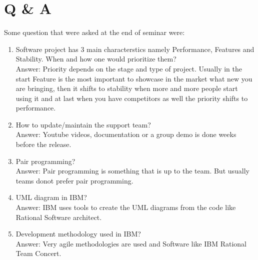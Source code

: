 \section{Q \& A}

Some question that were asked at the end of seminar were:

\begin{enumerate}
    \item Software project has 3 main characterstics namely Performance, Features and Stability. When and how one would prioritize them? \\
    Answer: Priority depends on the stage and type of project. Usually in the start Feature is the most important to showcase in the market what new you are bringing, then it shifts to stability when more and more people start using it and at last when you have competitors as well the priority shifts to performance.
    \item How to update/maintain the support team? \\
    Answer: Youtube videos, documentation or a group demo is done weeks before the release.
    \item Pair programming? \\
    Answer: Pair programming is something that is up to the team. But usually teams donot prefer pair programming.
    \item UML diagram in IBM? \\
    Answer: IBM uses tools to create the UML diagrams from the code like Rational Software architect.
    \item Development methodology used in IBM? \\
    Answer: Very agile methodologies are used and Software like IBM Rational Team Concert.

\end{enumerate}
